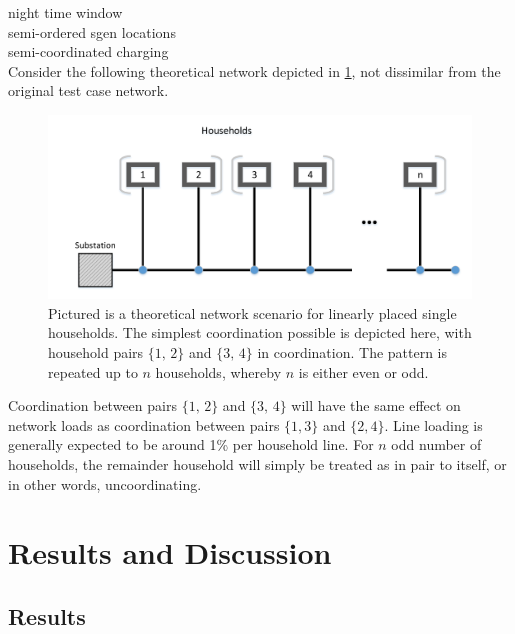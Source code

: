 \documentclass[a4paper,10pt]{report}
\begin{document}
night time window\\
semi-ordered sgen locations\\
semi-coordinated charging\\

\newpage
Consider the following theoretical network depicted in \cref{comm_topology}, not dissimilar from the original test case network.
\FloatBarrier
\begin{figure}[htpb]
	\centering
	\includegraphics[width=0.7\linewidth]{comm_topology}
	\caption{Pictured is a theoretical network scenario for linearly placed single households. The simplest coordination possible is depicted here, with household pairs $\{1,\,2\}$ and $\{3,\,4\}$ in coordination. The pattern is repeated up to $n$ households, whereby $n$ is either even or odd.}
	\label{comm_topology}
\end{figure}
\FloatBarrier

Coordination between pairs $\{1,\,2\}$ and $\{3,\,4\}$ will have the same effect on network loads as coordination between pairs $\{1,3\}$ and $\{2,4\}$. Line loading is generally expected to be around 1\% per household line. For $n$ odd number of households, the remainder household will simply be treated as in pair to itself, or in other words, uncoordinating.


\chapter{Results and Discussion}
\section{Results}
\end{document}
